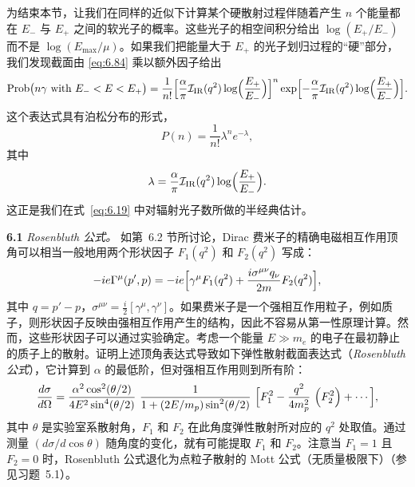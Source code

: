 为结束本节，让我们在同样的近似下计算某个硬散射过程伴随着产生 $n$ 个能量都在 $E_{-}$ 与 $E_{+}$ 之间的软光子的概率。这些光子的相空间积分给出 $\log(E_{+}/E_{-})$ 而不是 $\log(E_{\mathrm{max}}/\mu)$。如果我们把能量大于 $E_{+}$ 的光子划归过程的``硬''部分，我们发现截面由 \eqref{eq:6.84} 乘以额外因子给出
\begin{equation}
  \mathrm{Prob}\bigl( n\gamma \text{ with } E_{-} < E < E_{+} \bigr)
    = \frac{1}{n!}\Bigl[ \frac{\alpha}{\pi}\mathcal{I}_{\mathrm{IR}}(q^2)
      \log\Bigl( \frac{E_{+}}{E_{-}} \Bigr) \Bigr]^n
      \exp\Bigl[ -\frac{\alpha}{\pi}\mathcal{I}_{\mathrm{IR}}(q^2)
      \log\Bigl( \frac{E_{+}}{E_{-}} \Bigr) \Bigr] .
  \label{eq:6.86}
\end{equation}
这个表达式具有泊松分布的形式，
\begin{equation}
  P(n) = \frac{1}{n!}\lambda^n e^{-\lambda},
\end{equation}
其中
\begin{equation}
  \lambda = \frac{\alpha}{\pi}\mathcal{I}_{\mathrm{IR}}(q^2)\log\Bigl(
    \frac{E_{+}}{E_{-}} \Bigr) .
\end{equation}
这正是我们在式~\eqref{eq:6.19} 中对辐射光子数所做的半经典估计。

\problems

\textbf{6.1} \emph{Rosenbluth 公式。} 如第~6.2 节所讨论，Dirac 费米子的精确电磁相互作用顶角可以相当一般地用两个形状因子 $F_1(q^2)$ 和 $F_2(q^2)$ 写成：
\begin{equation}
  -ie\Gamma^\mu(p',p) = -ie\Bigl[ \gamma^\mu F_1(q^2)
    + \frac{i\sigma^{\mu\nu}q_\nu}{2m}F_2(q^2) \Bigr],
\end{equation}
其中 $q = p'-p$，$\sigma^{\mu\nu} = \tfrac{i}{2}[\gamma^\mu, \gamma^\nu]$。如果费米子是一个强相互作用粒子，例如质子，则形状因子反映由强相互作用产生的结构，因此不容易从第一性原理计算。然而，这些形状因子可以通过实验确定。考虑一个能量 $E \gg m_e$ 的电子在最初静止的质子上的散射。证明上述顶角表达式导致如下弹性散射截面表达式（\emph{Rosenbluth 公式}），它计算到 $\alpha$ 的最低阶，但对强相互作用则到所有阶：
\begin{equation}
  \frac{d\sigma}{d\Omega} = \frac{\alpha^2\cos^2(\theta/2)}
    {4E^2\sin^4(\theta/2)}\ \frac{1}{1 + (2E/m_p)\sin^2(\theta/2)}\
    \Bigl[ F_1^2 - \frac{q^2}{4m_p^2}\ \Bigl( F_2^2 \Bigr)
      + \cdots \Bigr],
\end{equation}
其中 $\theta$ 是实验室系散射角，$F_1$ 和 $F_2$ 在此角度弹性散射所对应的 $q^2$ 处取值。通过测量 $(d\sigma/d\cos\theta)$ 随角度的变化，就有可能提取 $F_1$ 和 $F_2$。注意当 $F_1 = 1$ 且 $F_2 = 0$ 时，Rosenbluth 公式退化为点粒子散射的 Mott 公式（无质量极限下）（参见习题~5.1）。

